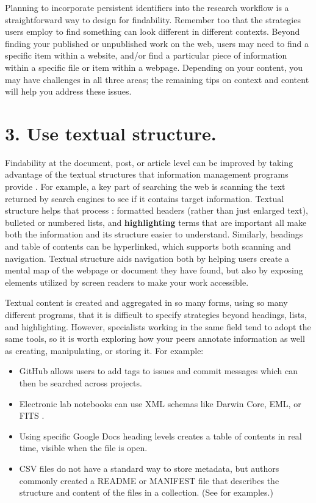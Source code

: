 \documentclass[10pt,letterpaper]{article}
\newcommand{\rulemajor}[1]{\section*{#1}}
\begin{document}
Planning to incorporate persistent identifiers into the research workflow is a
straightforward way to design for findability. Remember too that the strategies
users employ to find something can look different in different contexts. Beyond
finding your published or unpublished work on the web, users may need to find a
specific item within a website, and/or find a particular piece of information
within a specific file or item within a webpage. Depending on your content, you
may have challenges in all three areas; the remaining tips on context and
content will help you address these issues.

\rulemajor{3. Use textual structure.}

Findability at the document, post, or article level can be improved by taking
advantage of the textual structures that information management programs provide
\cite{Hedden2016}. For example, a key part of searching the web is scanning the
text returned by search engines to see if it contains target information.
Textual structure helps that process \cite{Krug2014}: formatted headers (rather
than just enlarged text), bulleted or numbered lists, and \textbf{highlighting}
terms that are important all make both the information and its structure easier
to understand. Similarly, headings and table of contents can be hyperlinked,
which supports both scanning and navigation. Textual structure aids navigation
both by helping users create a mental map of the webpage or document they have
found, but also by exposing elements utilized by screen readers to make your
work accessible.

Textual content is created and aggregated in so many forms, using so many
different programs, that it is difficult to specify strategies beyond headings,
lists, and highlighting. However, specialists working in the same field tend to
adopt the same tools, so it is worth exploring how your peers annotate
information as well as creating, manipulating, or storing it. For example:

\begin{itemize}

\item
  GitHub allows users to add tags to issues and commit messages which can then
  be searched across projects.

\item
  Electronic lab notebooks can use XML schemas like Darwin Core, EML, or FITS
  \cite{Briney2015}.

\item
  Using specific Google Docs heading levels creates a table of contents in real
  time, visible when the file is open.

\item
  CSV files do not have a standard way to store metadata, but authors commonly
  created a README or MANIFEST file that describes the structure and content of
  the files in a collection. (See \cite{Pudding} for examples.)

\end{itemize}
\end{document}
